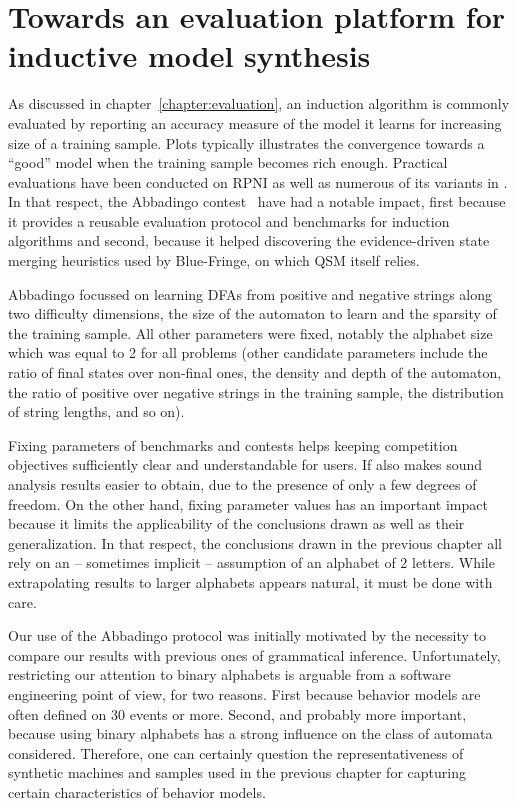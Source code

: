 \chapter{Towards an evaluation platform for inductive model synthesis\label{chapter:stamina}}

As discussed in chapter~\ref{chapter:evaluation}, an induction algorithm is commonly evaluated by reporting an accuracy measure of the model it learns for increasing size of a training sample. Plots typically illustrates the convergence towards a ``good'' model when the training sample becomes rich enough. Practical evaluations have been conducted on RPNI as well as numerous of its variants in \cite{Lang98,Damas06,Dupont08,Lambeau08}. In that respect, the Abbadingo contest~\cite{Lang98} have had a notable impact, first because it provides a reusable evaluation protocol and benchmarks for induction algorithms and second, because it helped discovering the evidence-driven state merging heuristics used by Blue-Fringe, on which QSM itself relies. 

Abbadingo focussed on learning DFAs from positive and negative strings along two difficulty dimensions, the size of the automaton to learn and the sparsity of the training sample. All other parameters were fixed, notably the alphabet size which was equal to 2 for all problems (other candidate parameters include the ratio of final states over non-final ones, the density and depth of the automaton, the ratio of positive over negative strings in the training sample, the distribution of string lengths, and so on).

Fixing parameters of benchmarks and contests helps keeping competition objectives sufficiently clear and understandable for users. If also makes sound analysis results easier to obtain, due to the presence of only a few degrees of freedom. On the other hand, fixing parameter values has an important impact because it limits the applicability of the conclusions drawn as well as their generalization. In that respect, the conclusions drawn in the previous chapter all rely on an -- sometimes implicit -- assumption of an alphabet of 2 letters. While extrapolating results to larger alphabets appears natural, it must be done with care.

Our use of the Abbadingo protocol was initially motivated by the necessity to compare our results with previous ones of grammatical inference. Unfortunately, restricting our attention to binary alphabets is arguable from a software engineering point of view, for two reasons. First because behavior models are often defined on 30 events or more. Second, and probably more important, because using binary alphabets has a strong influence on the class of automata considered. Therefore, one can certainly question the representativeness of synthetic machines and samples used in the previous chapter for capturing certain characteristics of behavior models. 

